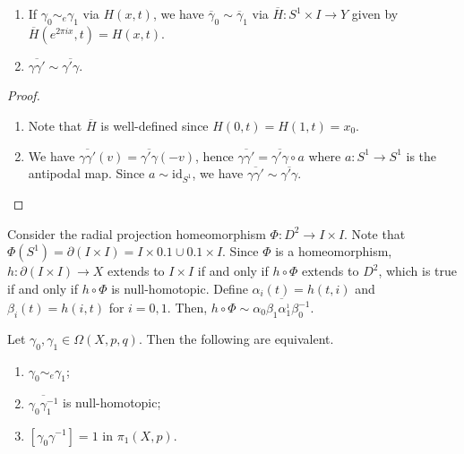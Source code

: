 \begin{lemma}
	\begin{enumerate}
		\item If \( \gamma_0 \sim_e \gamma_1 \) via \( H(x,t) \), we have \( \overline \gamma_0 \sim \overline \gamma_1 \) via \( \overline H \colon S^1 \times I \to Y \) given by \( \overline H(e^{2\pi i x}, t) = H(x,t) \).
		\item \( \overline{\gamma \gamma'} \sim \overline{\gamma'\gamma} \).
	\end{enumerate}
\end{lemma}
\begin{proof}
	\begin{enumerate}
		\item Note that \( \overline H \) is well-defined since \( H(0,t) = H(1,t) = x_0 \).
		\item We have \( \overline{\gamma\gamma'}(v) = \overline{\gamma'\gamma}(-v) \), hence \( \overline{\gamma\gamma'} = \overline{\gamma'\gamma} \circ a \) where \( a \colon S^1 \to S^1 \) is the antipodal map.
			Since \( a \sim \mathrm{id}_{S^1} \), we have \( \overline{\gamma\gamma'} \sim \overline{\gamma'\gamma} \).
	\end{enumerate}
\end{proof}
Consider the radial projection homeomorphism \( \Phi \colon D^2 \to I \times I \).
Note that \( \Phi(S^1) = \partial (I \times I) = I \times \qty{0,1} \cup \qty{0,1} \times I \).
Since \( \Phi \) is a homeomorphism, \( h \colon \partial (I \times I) \to X \) extends to \( I \times I \) if and only if \( h \circ \Phi \) extends to \( D^2 \), which is true if and only if \( h \circ \Phi \) is null-homotopic.
Define \( \alpha_i(t) = h(t,i) \) and \( \beta_i(t) = h(i,t) \) for \( i = 0,1 \).
Then, \( h \circ \Phi \sim \overline{\alpha_0\beta_1\alpha_1^{_1}\beta_0^{-1}} \).
\begin{proposition}
	Let \( \gamma_0, \gamma_1 \in \Omega(X,p,q) \).
	Then the following are equivalent.
	\begin{enumerate}
		\item \( \gamma_0 \sim_e \gamma_1 \);
		\item \( \overline{\gamma_0\gamma_1^{-1}} \) is null-homotopic;
		\item \( [\gamma_0\gamma^{-1}] = 1 \) in \( \pi_1(X,p) \).
	\end{enumerate}
\end{proposition}
